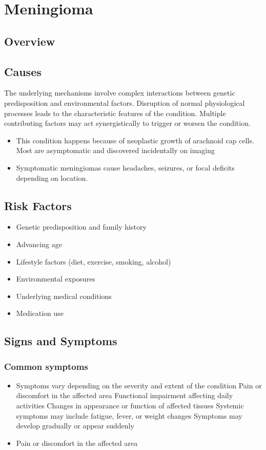 \chapter{Meningioma}
\label{sec:Meningioma}

\section{Overview}

\section{Causes}
The underlying mechanisms involve complex interactions between genetic predisposition and environmental factors. Disruption of normal physiological processes leads to the characteristic features of the condition. Multiple contributing factors may act synergistically to trigger or worsen the condition.

\begin{itemize}[noitemsep]
  \item This condition happens because of neoplastic growth of arachnoid cap cells. Most are asymptomatic and discovered incidentally on imaging
  \item Symptomatic meningiomas cause headaches, seizures, or focal deficits depending on location.
\end{itemize}
\section{Risk Factors}


\begin{itemize}[noitemsep]
  \item Genetic predisposition and family history
  \item Advancing age
  \item Lifestyle factors (diet, exercise, smoking, alcohol)
  \item Environmental exposures
  \item Underlying medical conditions
  \item Medication use
\end{itemize}
\section{Signs and Symptoms}

\subsection{Common symptoms}
\begin{itemize}[noitemsep]
  \item Symptoms vary depending on the severity and extent of the condition Pain or discomfort in the affected area Functional impairment affecting daily activities Changes in appearance or function of affected tissues Systemic symptoms may include fatigue, fever, or weight changes Symptoms may develop gradually or appear suddenly
  \item Pain or discomfort in the affected area
  \end{itemize}

